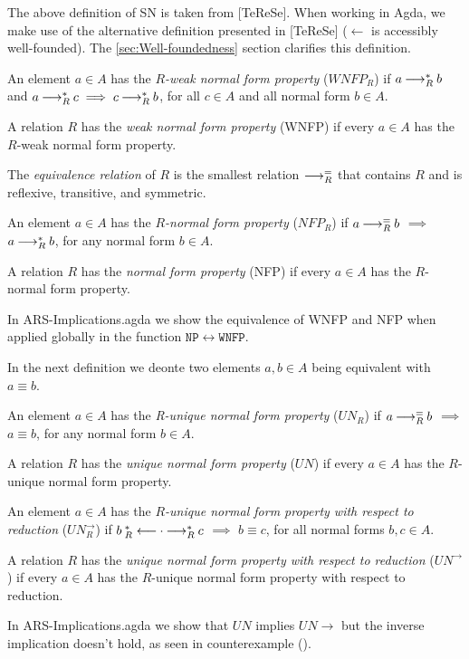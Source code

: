 The above definition of SN is taken from [TeReSe].
When working in Agda, we make use of the alternative definition presented in [TeReSe] ($\leftarrow$ is accessibly well-founded).
The \ref{sec:Well-foundedness} section clarifies this definition.

\begin{definition}
    An element $a \in A$ has the \emph{$R$-weak normal form property} ($WNFP_{R}$) if $a \mathbin{\longrightarrow_R^*} b$ and
    $a \mathbin{\longrightarrow_R^*} c \implies c \mathbin{\longrightarrow_R^*} b$, for all $c \in A$ and all normal form $b \in A$.

    A relation $R$ has the \emph{weak normal form property} (WNFP) if every $a \in A$ has the $R$-weak normal form property.
\end{definition}

\begin{definition}
    The \emph{equivalence relation} of $R$ is the smallest relation $\mathbin{\longrightarrow_R^=}$ that contains $R$ and is reflexive, transitive, and symmetric.
\end{definition}

\begin{definition}
An element $a \in A$ has the \emph{$R$-normal form property} ($NFP_{R}$) if
$a \mathbin{\longrightarrow_R^=} b$  $\implies$
$a \mathbin{\longrightarrow_R^*} b$, for any normal form $b \in A$.

A relation $R$ has the \emph{normal form property} (NFP) if every $a \in A$ has the $R$-normal form property.
\end{definition}

In ARS-Implications.agda we show the equivalence of WNFP and NFP when applied globally in the function $\mathtt{NP \leftrightarrow WNFP}$.

In the next definition we deonte two elements $a, b \in A$ being equivalent with $a \equiv b$.
\begin{definition}
An element $a \in A$ has the \emph{{R}-unique normal form property} ($UN_{R}$) if
$a \mathbin{\longrightarrow_R^=} b$  $\implies$
$a \equiv b$, for any normal form $b \in A$.

A relation $R$ has the \emph{unique normal form property} ($UN$) if every $a \in A$ has the $R$-unique normal form property.
\end{definition}


\begin{definition}
An element $a \in A$ has the \emph{${R}$-unique normal form property with respect to reduction} ($UN^ \to _{R}$) if
$b \mathbin{_R^*\longleftarrow}  \cdot  \mathbin{\longrightarrow_R^*} c$  $\implies$ $b \equiv c$, for all normal forms $b,c \in A$.

A relation $R$ has the \emph{unique normal form property with respect to reduction} ($UN^\to$) if every $a \in A$ has the
$R$-unique normal form property with respect to reduction.
\end{definition}
In ARS-Implications.agda we show that $UN$ implies $UN\to$ but the inverse implication doesn't hold, as seen
in counterexample ().

